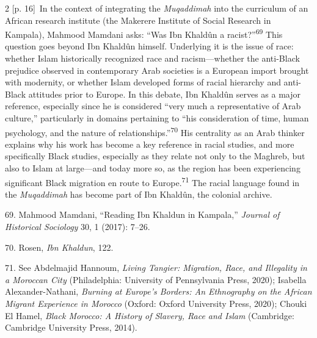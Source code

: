 \documentclass[10pt,a4paper]{article}
\begin{document}
\begin{paracol}{2}
\switchcolumn
{\scriptsize\color{gray} [p. 16]}\ In the context of integrating the \textit{Muqaddimah} into the curriculum of an African research institute (the Makerere Institute of Social Research in Kampala), Mahmood Mamdani asks: “Was Ibn Khaldûn a racist?”\nobreak\textsuperscript{69} This question goes beyond Ibn Khaldûn himself. Underlying it is the issue of race: whether Islam historically recognized race and racism—whether the anti-Black prejudice observed in contemporary Arab societies is a European import brought with modernity, or whether Islam developed forms of racial hierarchy and anti-Black attitudes prior to Europe. In this debate, Ibn Khaldûn serves as a major reference, especially since he is considered “very much a representative of Arab culture,” particularly in domains pertaining to “his consideration of time, human psychology, and the nature of relationships.”\nobreak\textsuperscript{70} His centrality as an Arab thinker explains why his work has become a key reference in racial studies, and more specifically Black studies, especially as they relate not only to the Maghreb, but also to Islam at large—and today more so, as the region has been experiencing significant Black migration en route to Europe.\nobreak\textsuperscript{71} The racial language found in the \textit{Muqaddimah} has become part of Ibn Khaldûn, the colonial archive.\par{\small 69. Mahmood Mamdani, “Reading Ibn Khaldun in Kampala,” \textit{Journal of Historical Sociology} 30, 1 (2017): 7–26.\par}{\small 70. Rosen, \textit{Ibn Khaldun}, 122.\par}{\small 71. See Abdelmajid Hannoum, \textit{Living Tangier: Migration, Race, and Illegality in a Moroccan City} (Philadelphia: University of Pennsylvania Press, 2020); Isabella Alexander-Nathani, \textit{Burning at Europe’s Borders: An Ethnography on the African Migrant Experience in Morocco} (Oxford: Oxford University Press, 2020); Chouki El Hamel, \textit{Black Morocco: A History of Slavery, Race and Islam} (Cambridge: Cambridge University Press, 2014).\par}
\switchcolumn*

\end{paracol}
\end{document}
